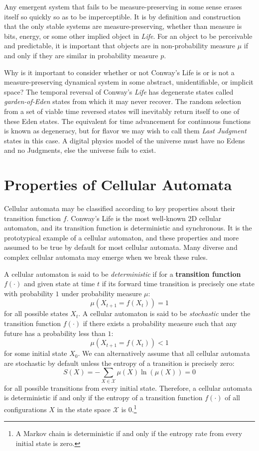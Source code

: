 \documentclass[10pt, a5paper, twoside, openright]{memoir}
\begin{document}
Any emergent system that fails to be measure-preserving in some sense erases itself so quickly so as to be imperceptible. It is by definition and construction that the only stable systems are measure-preserving, whether than measure is bits, energy, or some other implied object in \textit{Life}. For an object to be perceivable and predictable, it is important that objects are in non-probability measure $\mu$ if and only if they are similar in probability measure $p$.

Why is it important to consider whether or not Conway's Life is or is not a measure-preserving dynamical system in some abstract, unidentifiable, or implicit space? The temporal reversal of Conway's \textit{Life} has degenerate states called \textit{garden-of-Eden} states from which it may never recover. The random selection from a set of viable time reversed states will inevitably return itself to one of these Eden states. The equivalent for time advancement for continuous functions is known as degeneracy, but for flavor we may wish to call them \textit{Last Judgment} states in this case. A digital physics model of the universe must have no Edens and no Judgments, else the universe fails to exist.

\section{Properties of Cellular Automata}
Cellular automata may be classified according to key properties about their transition function $f$. Conway's Life is the most well-known 2D cellular automaton, and its transition function is deterministic and synchronous. It is the prototypical example of a cellular automaton, and these properties and more assumed to be true by default for most cellular automata. Many diverse and complex cellular automata may emerge when we break these rules.

A cellular automaton is said to be \textit{deterministic} if for a \textbf{transition function} $f(\cdot)$ and given state at time $t$ if its forward time transition is precisely one state with probability $1$ under probability measure $\mu$:
$$\mu( X_{t+1} = f(X_t)) = 1$$
for all possible states $X_t$. A cellular automaton is said to be \textit{stochastic} under the transition function $f(\cdot)$ if there exists a probability measure such that any future has a probability less than $1$:
$$\mu( X_{t+1} = f(X_t)) < 1$$
for some initial state $X_0$. We can alternatively assume that all cellular automata are stochastic by default unless the entropy of a transition is precisely zero:
$$S(X) = -\sum\limits_{X \in \mathcal X} \mu(X) \ln(\mu(X)) = 0$$
for all possible transitions from every initial state. Therefore, a cellular automata is deterministic if and only if the entropy of a transition function $f(\cdot)$ of all configurations $X$ in the state space $\mathcal X$ is $0$.\footnote{A Markov chain is deterministic if and only if the entropy rate from every initial state is zero.}
\end{document}

